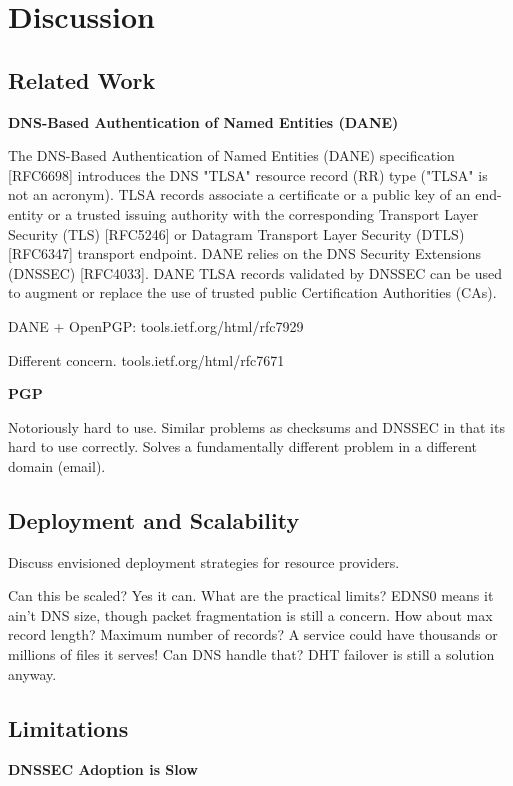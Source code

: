 \section{Discussion} \label{sec:discussion}

\subsection{Related Work}

\textbf{DNS-Based Authentication of Named Entities (DANE)}

The DNS-Based Authentication of Named Entities (DANE) specification [RFC6698]
introduces the DNS "TLSA" resource record (RR) type ("TLSA" is not an acronym).
TLSA records associate a certificate or a public key of an end-entity or a
trusted issuing authority with the corresponding Transport Layer Security (TLS)
[RFC5246] or Datagram Transport Layer Security (DTLS) [RFC6347] transport
endpoint. DANE relies on the DNS Security Extensions (DNSSEC) [RFC4033]. DANE
TLSA records validated by DNSSEC can be used to augment or replace the use of
trusted public Certification Authorities (CAs).

DANE + OpenPGP: tools.ietf.org/html/rfc7929

Different concern. tools.ietf.org/html/rfc7671

\textbf{PGP}

Notoriously hard to use. Similar problems as checksums and DNSSEC in that its
hard to use correctly. Solves a fundamentally different problem in a different
domain (email).

\subsection{Deployment and Scalability}

Discuss envisioned deployment strategies for resource providers.

Can this be scaled? Yes it can. What are the practical limits? EDNS0 means it
ain't DNS size, though packet fragmentation is still a concern. How about max
record length? Maximum number of records? A service could have thousands or
millions of files it serves! Can DNS handle that? DHT failover is still a
solution anyway.

\subsection{Limitations}

\textbf{DNSSEC Adoption is Slow}

